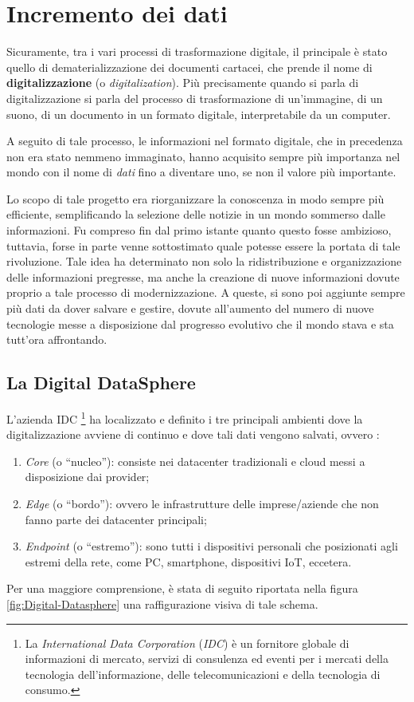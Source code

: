 \section{Incremento dei dati}

Sicuramente, tra i vari processi di trasformazione digitale, il principale è stato quello di dematerializzazione dei documenti cartacei, che prende il nome di \textbf{digitalizzazione} (o \textit{digitalization}). Più precisamente quando si parla di digitalizzazione si parla del processo di trasformazione di un'immagine, di un suono, di un documento in un formato digitale, interpretabile da un computer.

A seguito di tale processo, le informazioni nel formato digitale, che in precedenza non era stato nemmeno immaginato, hanno acquisito sempre più importanza nel mondo con il nome di \textit{dati} fino a diventare uno, se non il valore più importante.

Lo scopo di tale progetto era riorganizzare la conoscenza in modo sempre più efficiente, semplificando la selezione delle notizie in un mondo sommerso dalle informazioni. Fu compreso fin dal primo istante quanto questo fosse ambizioso, tuttavia, forse in parte venne sottostimato quale potesse essere la portata di tale rivoluzione. Tale idea ha determinato non solo la ridistribuzione e organizzazione delle informazioni pregresse, ma anche la creazione di nuove informazioni dovute proprio a tale processo di modernizzazione. A queste, si sono poi aggiunte sempre più dati da dover salvare e gestire, dovute all'aumento del numero di nuove tecnologie messe a disposizione dal progresso evolutivo che il mondo stava e sta tutt'ora affrontando. 

\subsection{La Digital DataSphere}

L'azienda IDC \footnote{La \textit{International Data Corporation} (\textit{IDC}) è un fornitore globale di informazioni di mercato, servizi di consulenza ed eventi per i mercati della tecnologia dell'informazione, delle telecomunicazioni e della tecnologia di consumo.} ha localizzato e definito i tre principali ambienti dove la digitalizzazione avviene di continuo e dove tali dati vengono salvati, ovvero \cite{idc_digital_datasphere}:

\begin{enumerate}
    \item \textit{Core} (o “nucleo”): consiste nei datacenter tradizionali e cloud messi a disposizione dai provider;
    \item \textit{Edge} (o “bordo”): ovvero le infrastrutture delle imprese/aziende che non fanno parte dei datacenter principali; 
    \item \textit{Endpoint} (o “estremo”): sono tutti i dispositivi personali che posizionati agli estremi della rete, come PC, smartphone, dispositivi IoT, eccetera. 
\end{enumerate}
Per una maggiore comprensione, è stata di seguito riportata nella figura \ref{fig:Digital-Datasphere} una raffigurazione visiva di tale schema.


